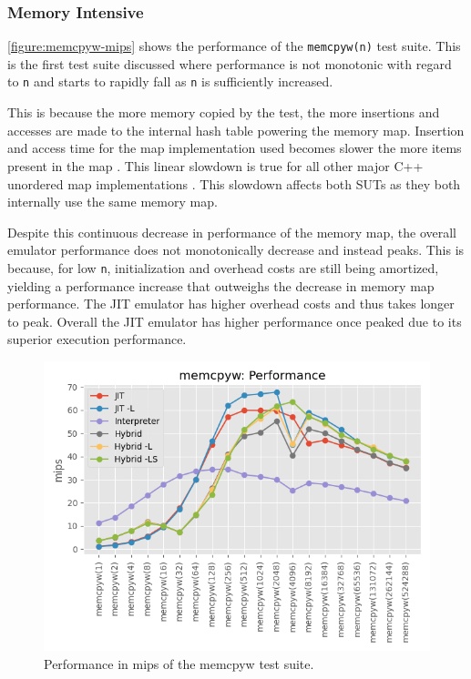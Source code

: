\subsubsection{Memory Intensive}
\label{section:perf-memory}


\autoref{figure:memcpyw-mips} shows the performance of the \texttt{memcpyw(n)} test suite. This is the first test suite discussed where performance is not monotonic with regard to \texttt{n} and starts to rapidly fall as \texttt{n} is sufficiently increased.

This is because the more memory copied by the test, the more insertions and accesses are made to the internal hash table powering the memory map. Insertion and access time for the map implementation used becomes slower the more items present in the map \cite{tessil-benchmark}. This linear slowdown is true for all other major C++ unordered map implementations \cite{tessil-benchmark}. This slowdown affects both SUTs as they both internally use the same memory map.

Despite this continuous decrease in performance of the memory map, the overall emulator performance does not monotonically decrease and instead peaks. This is because, for low \texttt{n}, initialization and overhead costs are still being amortized, yielding a performance increase that outweighs the decrease in memory map performance. The JIT emulator has higher overhead costs and thus takes longer to peak. Overall the JIT emulator has higher performance once peaked due to its superior execution performance.

\begin{figure}[H]
    \centering
    \includegraphics[scale=0.75]{output/graphs/tests/all/memcpyw/mips.png}
    \caption{Performance in mips of the memcpyw test suite.}
    \label{figure:memcpyw-mips}
\end{figure}
